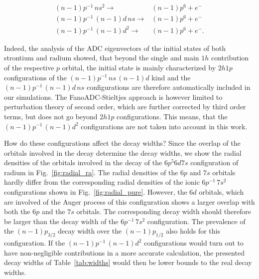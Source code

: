 \begin{align*}
 (n-1)p^{-1} \,ns^2         \rightarrow & (n-1)p^6 + e^- \\
 (n-1)p^{-1} \,(n-1)d \, ns \rightarrow & (n-1)p^6 + e^- \\
 (n-1)p^{-1} \,(n-1)d^2     \rightarrow & (n-1)p^6 + e^- .
\end{align*}

Indeed, the analysis of the ADC eigenvectors of the initial states of both
strontium and radium showed,
that beyond the single and main $1h$ contribution of the respective $p$ orbital, the
initial state is mainly characterized by $2h1p$ configurations of the
$(n-1)p^{-1} \,ns \, (n-1)d$ kind and the $(n-1)p^{-1} \,(n-1)d \, ns$
configurations are therefore automatically included in our simulations.
The FanoADC-Stieltjes approach is however limited
to perturbation theory of second order, which are further corrected by third order
terms, but does not go beyond $2h1p$ configurations. This means, that the
$(n-1)p^{-1} \,(n-1)d^2$ configurations are not taken into account in this work.

How do these configurations affect the decay widths? Since the overlap of the
orbitals involved in the decay determine the decay widths, we show the
radial densities of the orbitals involved in the decay of the $6p^5 6d 7s$
configuration of radium in Fig.~\ref{fig:radial_ra}.
The radial densities of the $6p$ and $7s$ orbitals hardly differ from the
corresponding radial densities of the ionic $6p^{-1} \,7s^2$ configurations
shown in Fig.~\ref{fig:radial_pure}. However, the $6d$ orbitals, which are involved
of the Auger process of this configuration shows a larger overlap with both
the $6p$ and the $7s$ orbitals. The corresponding decay width should therefore
be larger than the decay width of the $6p^{-1} \,7s^2$ configuration.
The prevalence of the $(n-1)p_{3/2}$ decay width over the $(n-1)p_{1/2}$
also holds for this configuration.
If the $(n-1)p^{-1} \,(n-1)d^2$ configurations would turn out to
have non-negligible contributions
in a more accurate calculation,
the presented decay widths of Table~\ref{tab:widths} would then be
lower bounds to the real decay widths.

